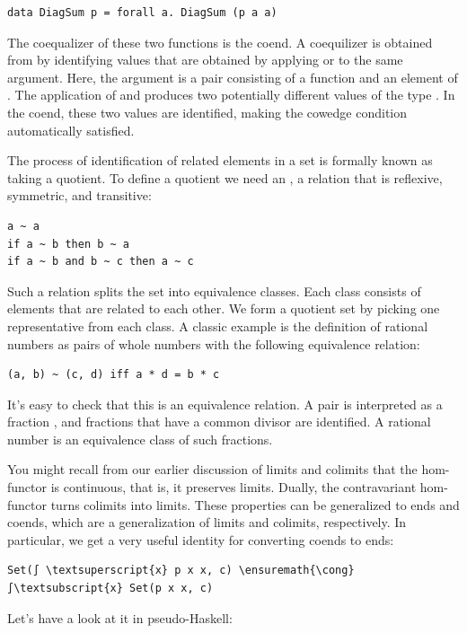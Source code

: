 \begin{Verbatim}[commandchars=\\\{\}]
data DiagSum p = forall a. DiagSum (p a a)
\end{Verbatim}
The coequalizer of these two functions is the coend. A coequilizer is
obtained from  by identifying values that are
obtained by applying  or  to the same
argument. Here, the argument is a pair consisting of a function
 and an element of . The
application of  and  produces two potentially
different values of the type . In the coend, these
two values are identified, making the cowedge condition automatically
satisfied.

The process of identification of related elements in a set is formally
known as taking a quotient. To define a quotient we need an
 \code{\textasciitilde{}}, a relation that
is reflexive, symmetric, and transitive:

\begin{Verbatim}[commandchars=\\\{\}]
a ~ a
if a ~ b then b ~ a
if a ~ b and b ~ c then a ~ c
\end{Verbatim}
Such a relation splits the set into equivalence classes. Each class
consists of elements that are related to each other. We form a quotient
set by picking one representative from each class. A classic example is
the definition of rational numbers as pairs of whole numbers with the
following equivalence relation:

\begin{Verbatim}[commandchars=\\\{\}]
(a, b) ~ (c, d) iff a * d = b * c
\end{Verbatim}
It's easy to check that this is an equivalence relation. A pair
 is interpreted as a fraction , and
fractions that have a common divisor are identified. A rational number
is an equivalence class of such fractions.

You might recall from our earlier discussion of limits and colimits that
the hom-functor is continuous, that is, it preserves limits. Dually, the
contravariant hom-functor turns colimits into limits. These properties
can be generalized to ends and coends, which are a generalization of
limits and colimits, respectively. In particular, we get a very useful
identity for converting coends to ends:

\begin{Verbatim}[commandchars=\\\{\}]
Set(∫ \textsuperscript{x} p x x, c) \ensuremath{\cong} ∫\textsubscript{x} Set(p x x, c)
\end{Verbatim}
Let's have a look at it in pseudo-Haskell:

